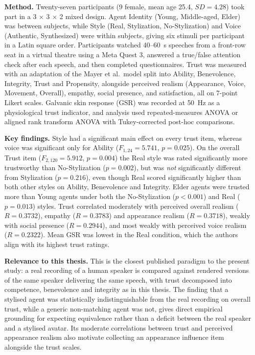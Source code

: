 \documentclass[11pt, a4paper]{article}
\begin{document}
\textbf{Method.} Twenty-seven participants (9 female, mean age 25.4, $SD = 4.28$) took part in a 3 $\times$ 3 $\times$ 2 mixed design. Agent Identity (Young, Middle-aged, Elder) was between subjects, while Style (Real, Stylization, No-Stylization) and Voice (Authentic, Synthesized) were within subjects, giving six stimuli per participant in a Latin square order. Participants watched 40--60~s speeches from a front-row seat in a virtual theatre using a Meta Quest 3, answered a true/false attention check after each speech, and then completed questionnaires. Trust was measured with an adaptation of the Mayer et al.\ model split into Ability, Benevolence, Integrity, Trust and Propensity, alongside perceived realism (Appearance, Voice, Movement, Overall), empathy, social presence, and satisfaction, all on 7-point Likert scales. Galvanic skin response (GSR) was recorded at 50~Hz as a physiological trust indicator, and analysis used repeated-measures ANOVA or aligned rank transform ANOVA with Tukey-corrected post-hoc comparisons.

\textbf{Key findings.} Style had a significant main effect on every trust item, whereas voice was significant only for Ability ($F_{1,24} = 5.741$, $p = 0.025$). On the overall Trust item ($F_{2,120} = 5.912$, $p = 0.004$) the Real style was rated significantly more trustworthy than No-Stylization ($p = 0.002$), but was \textit{not} significantly different from Stylization ($p = 0.216$), even though Real scored significantly higher than both other styles on Ability, Benevolence and Integrity. Elder agents were trusted more than Young agents under both the No-Stylization ($p < 0.001$) and Real ($p = 0.013$) styles. Trust correlated moderately with perceived overall realism ($R = 0.3732$), empathy ($R = 0.3783$) and appearance realism ($R = 0.3718$), weakly with social presence ($R = 0.2944$), and most weakly with perceived voice realism ($R = 0.2322$). Mean GSR was lowest in the Real condition, which the authors align with its highest trust ratings.

\textbf{Relevance to this thesis.} This is the closest published paradigm to the present study: a real recording of a human speaker is compared against rendered versions of the same speaker delivering the same speech, with trust decomposed into competence, benevolence and integrity as in this thesis. The finding that a stylised agent was statistically indistinguishable from the real recording on overall trust, while a generic non-matching agent was not, gives direct empirical grounding for expecting equivalence rather than a deficit between the real speaker and a stylised avatar. Its moderate correlations between trust and perceived appearance realism also motivate collecting an appearance influence item alongside the trust scales.
\end{document}
